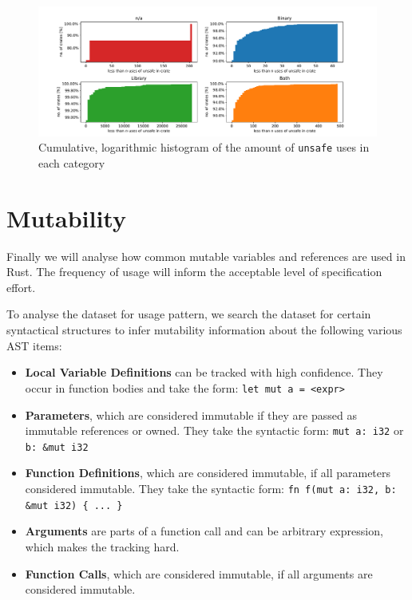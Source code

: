 \documentclass{book}
\newcommand{\code}[1]{\texttt{#1}}
\theoremstyle{definition}
\begin{document}
\begin{figure}[h]
	\centering
	\includegraphics[width=0.99\linewidth, clip, trim={0.2cm 0.2cm 0.2cm 0.2cm}]{../unsafe_counts_by_crate_type.pdf}
	\caption{Cumulative, logarithmic histogram of the amount of \code{unsafe} uses in each category}
	\label{fig:unsafe-hist}
\end{figure}


\label{sec:analysis-mutability} \section{Mutability}

Finally we will analyse how common mutable variables and references are used in Rust. 
The frequency of usage will inform the acceptable level of specification effort.

To analyse the dataset for usage pattern, we search the dataset for certain syntactical structures to infer mutability information about the following various AST items:
\begin{itemize}
	\item \textbf{Local Variable Definitions} can be tracked with high confidence. They occur in function bodies and take the form: \code{let mut a = <expr>}
	\item \textbf{Parameters}, which are considered immutable if they are passed as immutable references or owned. They take the syntactic form: \code{mut a: i32} or \code{b: \&mut i32}
	\item \textbf{Function Definitions}, which are considered immutable, if all parameters considered immutable. They take the syntactic form: \code{fn f(mut a: i32, b: \&mut i32) \{ ... \}}
	\item \textbf{Arguments} are parts of a function call and can be arbitrary expression, which makes the tracking hard.
	\item \textbf{Function Calls}, which are considered immutable, if all arguments are considered immutable.
\end{itemize}
\end{document}
